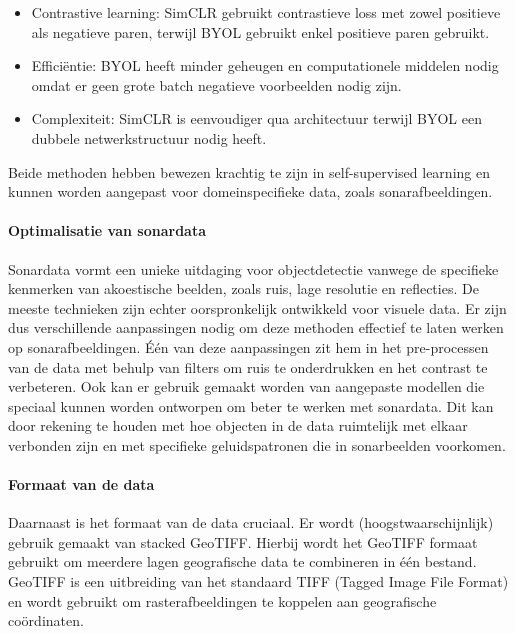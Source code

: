 \begin{itemize}
    \item Contrastive learning: SimCLR gebruikt contrastieve loss met zowel positieve als negatieve paren, 
    terwijl BYOL gebruikt enkel positieve paren gebruikt.
    \item Efficiëntie: BYOL heeft minder geheugen en computationele middelen nodig omdat er geen grote batch negatieve voorbeelden nodig zijn.
    \item Complexiteit: SimCLR is eenvoudiger qua architectuur terwijl BYOL een dubbele netwerkstructuur nodig heeft.
\end{itemize}

Beide methoden hebben bewezen krachtig te zijn in self-supervised learning en kunnen worden aangepast voor domeinspecifieke data, zoals sonarafbeeldingen.

\paragraph{Optimalisatie van sonardata}

Sonardata vormt een unieke uitdaging voor objectdetectie vanwege de specifieke kenmerken van akoestische beelden, zoals ruis, lage resolutie en reflecties. De meeste technieken zijn echter oorspronkelijk ontwikkeld voor visuele data. Er zijn dus verschillende aanpassingen nodig om deze methoden effectief te laten werken op sonarafbeeldingen. Één van deze aanpassingen zit hem in het pre-processen van de data met behulp van filters om ruis te onderdrukken en het contrast te verbeteren. Ook kan er gebruik gemaakt worden van aangepaste modellen die speciaal kunnen worden ontworpen om beter te werken met sonardata. Dit kan door rekening te houden met hoe objecten in de data ruimtelijk met elkaar verbonden zijn en met specifieke geluidspatronen die in sonarbeelden voorkomen. \autocite{Karimanzira_2020}

\paragraph{Formaat van de data}

Daarnaast is het formaat van de data cruciaal. Er wordt (hoogstwaarschijnlijk) gebruik gemaakt van stacked GeoTIFF. Hierbij wordt het GeoTIFF formaat gebruikt om meerdere lagen geografische data te combineren in één bestand. GeoTIFF is een uitbreiding van het standaard TIFF (Tagged Image File Format) en wordt gebruikt om rasterafbeeldingen te koppelen aan geografische coördinaten. \autocite{Ritter_1997}

